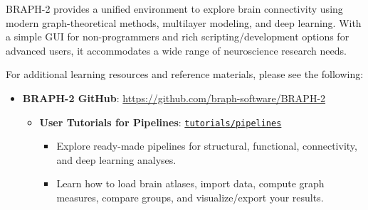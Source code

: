 \documentclass[justified]{tufte-handout}
\begin{document}
BRAPH-2 provides a unified environment to explore brain connectivity using modern graph-theoretical methods, multilayer modeling, and deep learning. 
With a simple GUI for non-programmers and rich scripting/development options for advanced users, it accommodates a wide range of neuroscience research needs.

For additional learning resources and reference materials, please see the following:

\begin{itemize}
    \item \textbf{BRAPH-2 GitHub}: \url{https://github.com/braph-software/BRAPH-2}
\begin{itemize}
    \item \textbf{User Tutorials for Pipelines}: 
    \href{https://github.com/braph-software/BRAPH-2/tree/develop/tutorials/pipelines}{\texttt{tutorials/pipelines}}
    \begin{itemize}
        \item Explore ready-made pipelines for structural, functional, connectivity, and deep learning analyses.
        \item Learn how to load brain atlases, import data, compute graph measures, compare groups, and visualize/export your results.
    \end{itemize}


\end{itemize}
\end{itemize}
\end{document}
